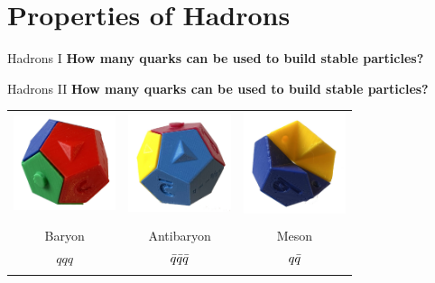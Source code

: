 \section{Properties of Hadrons}
\begin{frame}{Hadrons I}
     \hspace{0.2cm} \textbf{How many quarks can be used to build stable particles?} \\
    \end{frame}
 \begin{frame}{Hadrons II}
\textbf{How many quarks can be used to build stable particles?}
\begin{table}[]
    \centering
    \begin{tabular}{ccc}
        \includegraphics[width=3cm]{Figures Lecture on Hadrons/QuarkPuzzle_Baryon.jpg}&\includegraphics[width=3cm]{Figures Lecture on Hadrons/QuarkPuzzle_Antibaryon.jpg}&\includegraphics[width=3cm]{Figures Lecture on Hadrons/QuarkPuzzle_Meson.jpg} \\
        &&\\
        Baryon &   Antibaryon  & Meson    \\
        $qqq$ &  $\Bar{q}\Bar{q}\Bar{q} $&$ q\Bar{q}$ \\
        &&\\

\end{tabular}
\end{table}
\end{frame}
